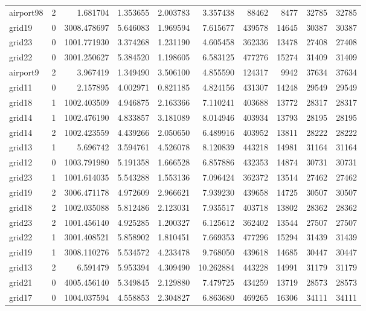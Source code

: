 \begin{longtable}{|l|r|r|r|r|r|r|r|r|r|}
airport98 & 2 & 1.681704 & 1.353655 & 2.003783 & 3.357438 & 88462 & 8477 & 32785 & 32785 \\
grid19 & 0 & 3008.478697 & 5.646083 & 1.969594 & 7.615677 & 439578 & 14645 & 30387 & 30387 \\
grid23 & 0 & 1001.771930 & 3.374268 & 1.231190 & 4.605458 & 362336 & 13478 & 27408 & 27408 \\
grid22 & 0 & 3001.250627 & 5.384520 & 1.198605 & 6.583125 & 477276 & 15274 & 31409 & 31409 \\
airport9 & 2 & 3.967419 & 1.349490 & 3.506100 & 4.855590 & 124317 & 9942 & 37634 & 37634 \\
grid11 & 0 & 2.157895 & 4.002971 & 0.821185 & 4.824156 & 431307 & 14248 & 29549 & 29549 \\
grid18 & 1 & 1002.403509 & 4.946875 & 2.163366 & 7.110241 & 403688 & 13772 & 28317 & 28317 \\
grid14 & 1 & 1002.476190 & 4.833857 & 3.181089 & 8.014946 & 403934 & 13793 & 28195 & 28195 \\
grid14 & 2 & 1002.423559 & 4.439266 & 2.050650 & 6.489916 & 403952 & 13811 & 28222 & 28222 \\
grid13 & 1 & 5.696742 & 3.594761 & 4.526078 & 8.120839 & 443218 & 14981 & 31164 & 31164 \\
grid12 & 0 & 1003.791980 & 5.191358 & 1.666528 & 6.857886 & 432353 & 14874 & 30731 & 30731 \\
grid23 & 1 & 1001.614035 & 5.543288 & 1.553136 & 7.096424 & 362372 & 13514 & 27462 & 27462 \\
grid19 & 2 & 3006.471178 & 4.972609 & 2.966621 & 7.939230 & 439658 & 14725 & 30507 & 30507 \\
grid18 & 2 & 1002.035088 & 5.812486 & 2.123031 & 7.935517 & 403718 & 13802 & 28362 & 28362 \\
grid23 & 2 & 1001.456140 & 4.925285 & 1.200327 & 6.125612 & 362402 & 13544 & 27507 & 27507 \\
grid22 & 1 & 3001.408521 & 5.858902 & 1.810451 & 7.669353 & 477296 & 15294 & 31439 & 31439 \\
grid19 & 1 & 3008.110276 & 5.534572 & 4.233478 & 9.768050 & 439618 & 14685 & 30447 & 30447 \\
grid13 & 2 & 6.591479 & 5.953394 & 4.309490 & 10.262884 & 443228 & 14991 & 31179 & 31179 \\
grid21 & 0 & 4005.456140 & 5.349845 & 2.129880 & 7.479725 & 434259 & 13719 & 28573 & 28573 \\
grid17 & 0 & 1004.037594 & 4.558853 & 2.304827 & 6.863680 & 469265 & 16306 & 34111 & 34111 \\

\end{longtable}
